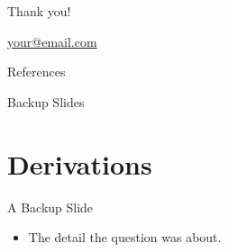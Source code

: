 \documentclass[10pt]{beamer}
\begin{document}

\begin{frame}
  \centering
  {\LARGE\inserttitle\par}
  \vspace{3em}
  {\Large Thank you!\par}
  \vspace{1em}
  {\Large\href{mailto:your@email.com}{your@email.com}\par}
\end{frame}

\begin{frame}[allowframebreaks]{References}
  \newrefcontext[sorting=nyt]
  \printbibliography[heading=none]
\end{frame}


\appendix

\begin{frame}{Backup Slides}
  \tableofcontents
\end{frame}

\section{Derivations}

\begin{frame}[label=derivation]{A Backup Slide}{}
  \begin{itemize}
    \item The detail the question was about.
  \end{itemize}
\end{frame}
\end{document}
